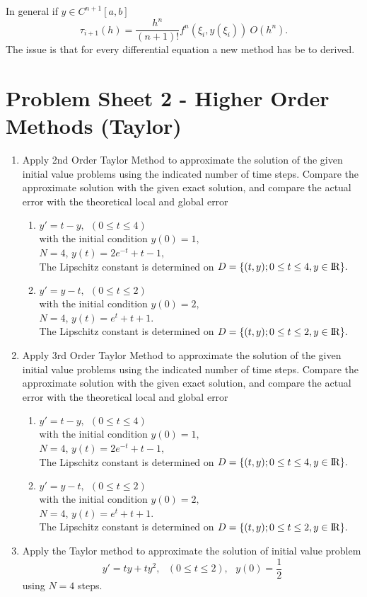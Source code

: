 In general if $y \in C^{n+1}[a,b]$
\[\tau_{i+1}(h)=\frac{h^n}{(n+1)!}f^{n}(\xi_i,y(\xi_i))~O(h^n). \]
The issue is that for every differential equation a new method has be to derived.

\newpage
\section{Problem Sheet 2 - Higher Order Methods (Taylor)}
\begin{enumerate}

\item
Apply 2nd Order Taylor Method to approximate the solution of the given initial value problems using the indicated number of time steps. Compare the approximate solution with the given exact solution, and compare the actual error with the theoretical local and global error
\begin{enumerate}
\item
$y'=t-y, \ \ (0\leq t \leq 4)$\\
with the initial condition $y(0)=1,$\\
$N=4$, 
$y(t)=2e^{-t}+t-1,$\\

The Lipschitz constant is determined on  $D=\{(t,y);0\leq t \leq 4, y\in \rm I\!R \}.$
\item 
$y'=y-t, \ \ (0\leq t \leq 2)$\\
with the initial condition $y(0)=2,$\\
$N=4$, 
$y(t)=e^{t}+t+1$.\\

The Lipschitz constant is determined on  $D=\{(t,y);0\leq t \leq 2, y\in \rm I\!R \}.$
\end{enumerate}
\item
Apply 3rd Order Taylor Method to approximate the solution of the given initial value problems using the indicated number of time steps. Compare the approximate solution with the given exact solution, and compare the actual error with the theoretical local and global error
\begin{enumerate}
\item
$y'=t-y, \ \ (0\leq t \leq 4)$\\
with the initial condition $y(0)=1,$\\
$N=4$, 
$y(t)=2e^{-t}+t-1,$\\

The Lipschitz constant is determined on  $D=\{(t,y);0\leq t \leq 4, y\in \rm I\!R \}.$
\item 
$y'=y-t, \ \ (0\leq t \leq 2)$\\
with the initial condition $y(0)=2,$\\
$N=4$, 
$y(t)=e^{t}+t+1$.\\

The Lipschitz constant is determined on  $D=\{(t,y);0\leq t \leq 2, y\in \rm I\!R \}.$
\end{enumerate}
\item
Apply the Taylor method to approximate the solution of initial value problem
\[ y'=ty+ty^2, \ \ \ (0\leq t \leq 2), \ \ \ y(0)=\frac{1}{2} \]
using $N=4$ steps.
\end{enumerate}
\newpage